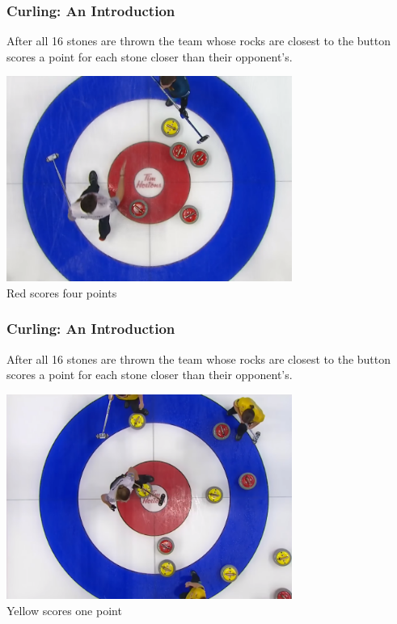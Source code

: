 \documentclass{beamer}
\begin{document}
\begin{frame}\frametitle{Curling: An Introduction}
    After all 16 stones are thrown the team whose rocks are closest to the button scores a point for each stone closer than their opponent's.
    \begin{block}{}
        \centering
        \includegraphics[width=0.7\textwidth]{Images/Score_of_4.png}\\

        Red scores four points
    \end{block}
\end{frame}

\begin{frame}\frametitle{Curling: An Introduction}
    After all 16 stones are thrown the team whose rocks are closest to the button scores a point for each stone closer than their opponent's.
    \begin{block}{}
        \centering
        \includegraphics[width=0.7\textwidth]{Images/Score_of_1.png}\\
        Yellow scores one point
    \end{block}
\end{frame}
\end{document}
